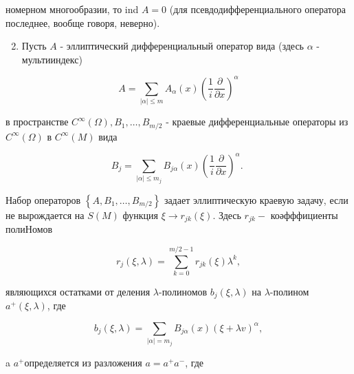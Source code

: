 \documentclass[10pt]{article}
\begin{document}
номерном многообразии, то ind $A=0$ (для псевдодифференциального оператора последнее, вообще говоря, неверно).



\begin{enumerate}

  \setcounter{enumi}{1}

  \item Пусть $A$ - эллиптический дифференциальный оператор вида (здесь $\alpha$ - мультииндекс)

\end{enumerate}



\[

A=\sum_{|\alpha| \leqslant m} A_{\alpha}(x)\left(\frac{1}{i} \frac{\partial}{\partial x}\right)^{\alpha}

\]



в пространстве $C^{\infty}(\Omega), B_{1}, \ldots, B_{m / 2}$ - краевые дифференциальные операторы из $C^{\infty}(\Omega)$ в $C^{\infty}(M)$ вида



\[

B_{j}=\sum_{|\alpha| \leqslant m_{j}} B_{j \alpha}(x)\left(\frac{1}{i} \frac{\partial}{\partial x}\right)^{\alpha} \text {. }

\]



Набор операторов $\left\{A, B_{1}, \ldots, B_{m / 2}\right\}$ задает эллиптическую краевую задачу, если не вырождается на $S(M)$ функция $\xi \rightarrow r_{j k}(\xi)$. Здесь $r_{j k}-$ коәфффициенты полиНомов



\[

r_{j}(\xi, \lambda)=\sum_{k=0}^{m / 2-1} r_{j k}(\xi) \lambda^{k},

\]



являющихся остатками от деления $\lambda$-полиномов $b_{j}(\xi, \lambda)$ на $\lambda$-полином $a^{+}(\xi, \lambda)$, где



\[

b_{j}(\xi, \lambda)=\sum_{|\alpha|=m_{j}} B_{j \alpha}(x)(\xi+\lambda v)^{\alpha},

\]



a $a^{+}$определяется из разложения $a=a^{+} a^{-}$, где
\end{document}

